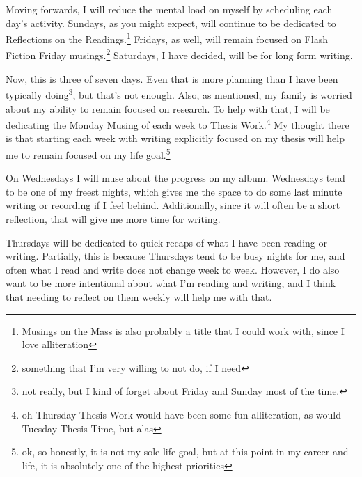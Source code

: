 \documentclass[12pt]{article}[titlepage]
\renewcommand{\,}{\textsuperscript{,}}
\begin{document}
Moving forwards, I will reduce the mental load on myself by scheduling each day's activity.
Sundays, as you might expect, will continue to be dedicated to Reflections on the Readings.\footnote{Musings on the Mass is also probably a title that I could work with, since I love alliteration}
Fridays, as well, will remain focused on Flash Fiction Friday musings.\footnote{something that I'm very willing to not do, if I need}
Saturdays, I have decided, will be for long form writing.

Now, this is three of seven days.
Even that is more planning than I have been typically doing\footnote{not really, but I kind of forget about Friday and Sunday most of the time.}, but that's not enough.
Also, as mentioned, my family is worried about my ability to remain focused on research.
To help with that, I will be dedicating the Monday Musing of each week to Thesis Work.\footnote{oh Thursday Thesis Work would have been some fun alliteration, as would Tuesday Thesis Time, but alas}
My thought there is that starting each week with writing explicitly focused on my thesis will help me to remain focused on my life goal.\footnote{ok, so honestly, it is not my sole life goal, but at this point in my career and life, it is absolutely one of the highest priorities}

On Wednesdays I will muse about the progress on my album.
Wednesdays tend to be one of my freest nights, which gives me the space to do some last minute writing or recording if I feel behind.
Additionally, since it will often be a short reflection, that will give me more time for writing.

Thursdays will be dedicated to quick recaps of what I have been reading or writing.
Partially, this is because Thursdays tend to be busy nights for me, and often what I read and write does not change week to week.
However, I do also want to be more intentional about what I'm reading and writing, and I think that needing to reflect on them weekly will help me with that.
\end{document}
